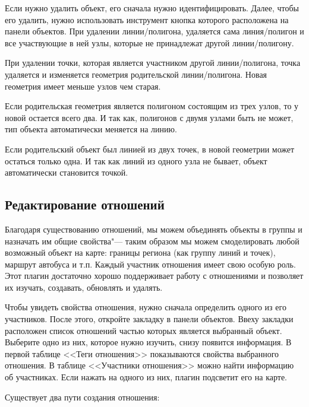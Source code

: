 
Если нужно удалить объект, его сначала нужно идентифицировать. Далее,
чтобы его удалить, нужно использовать инструмент
 кнопка которого
расположена на панели объектов. При удалении линии/полигона, удаляется
сама линия/полигон и все участвующие в ней узлы, которые не принадлежат
другой линии/полигону.

При удалении точки, которая является участником другой линии/полигона,
точка удаляется и изменяется геометрия родительской линии/полигона.
Новая геометрия имеет меньше узлов чем старая.

Если родительская геометрия является полигоном состоящим из трех узлов,
то у новой остается всего два. И так как, полигонов с двумя узлами быть
не может, тип объекта автоматически меняется на линию.

Если родительский объект был линией из двух точек, в новой геометрии
может остаться только одна. И так как линий из одного узла не бывает,
объект автоматически становится точкой.

\subsection{Редактирование отношений}\label{editing_osm_relation}

Благодаря существованию отношений, мы можем объединять объекты в группы
и назначать им общие свойства"--- таким образом мы можем смоделировать
любой возможный объект на карте: границы региона (как группу линий и
точек), маршрут автобуса и т.п. Каждый участник отношения имеет свою
особую роль. Этот плагин достаточно хорошо поддерживает работу с
отношениями и позволяет их изучать, создавать, обновлять и удалять.

\label{examrelation}

Чтобы увидеть свойства отношения, нужно сначала определить одного из его
участников. После этого, откройте закладку  в панели
объектов. Ввеху закладки расположен список отношений частью которых
является выбранный объект. Выберите одно из них, которое нужно изучить,
снизу появится информация. В первой таблице <<Теги отношения>>
показываются свойства выбранного отношения. В таблице <<Участники
отношения>> можно найти информацию об участниках. Если нажать на одного
из них, плагин подсветит его на карте.


Существует два пути создания отношения:


